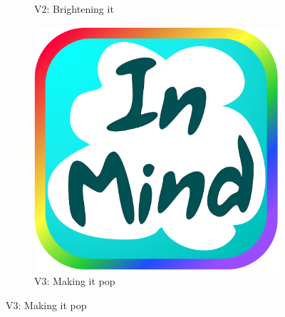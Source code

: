 \begin{figure}
\begin{subfigure}[b]{0.25\textwidth}
       \caption{V2: Brightening it}
    \end{subfigure}
    \begin{subfigure}[b]{0.25\textwidth}
      \includegraphics[width=\textwidth]{inmind_logo2.png}
       \caption{V3: Making it pop}
    \end{subfigure}
    \label{fig:icons}
  \end{figure}

